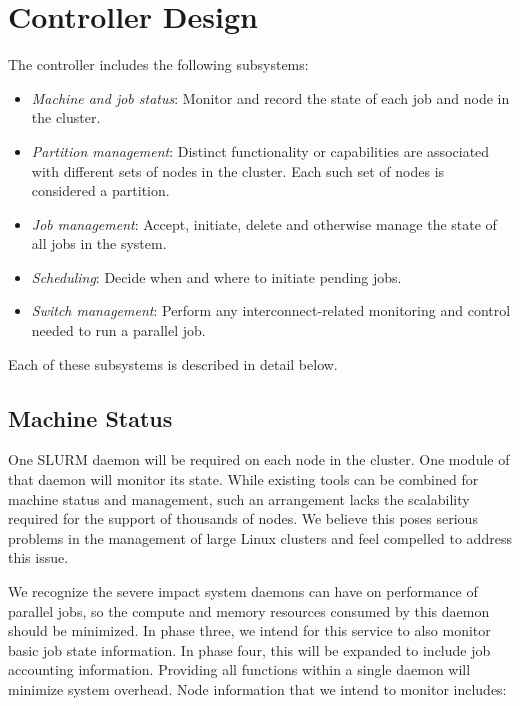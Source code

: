 
\section{Controller Design}


The controller includes the following subsystems:

\begin{itemize}
\item {\em Machine and job status}: Monitor and record the state of each 
job and node in the cluster.

\item {\em Partition management}: Distinct functionality or capabilities 
are associated with different sets of nodes in the cluster.  Each such set 
of nodes is considered a partition. 

\item {\em Job management}: Accept, initiate, delete and otherwise manage 
the state of all jobs in the system.

\item {\em Scheduling}: Decide when and where to initiate pending jobs.

\item {\em Switch management}: Perform any interconnect-related 
monitoring and control needed to run a parallel job.

\end{itemize}

Each of these subsystems is described in detail below.

\subsection{Machine Status}

One SLURM daemon will be required on each node in the cluster.
One module of that daemon will monitor its state.
While existing tools can be combined for machine status and management, such an
arrangement lacks the scalability required for the support of thousands of
nodes. We believe this poses serious problems in the management of large Linux
clusters and feel compelled to address this issue. 

We recognize the severe impact system daemons can have on performance of
parallel jobs, so the compute and memory resources consumed by this daemon
should be minimized. In phase three, we intend for this service to also monitor
basic job state information. In phase four, this will be expanded to include 
job accounting information. Providing all functions
within a single daemon will minimize system overhead. Node information that we
intend to monitor includes:

